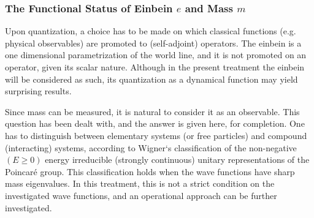 \documentclass[twoside,a4paper,11pt]{article}
\numberwithin{equation}{section}
\begin{document}

 
\subsubsection{The Functional Status of Einbein $e$ and Mass $m$}

Upon quantization, a choice has to be made on which classical functions (e.g. physical observables) are promoted to (self-adjoint) operators. The einbein is a one dimensional parametrization of the world line, and it is not promoted on an operator, given its scalar nature. Although in the present treatment the einbein will be considered as such, its quantization as a dynamical function may yield surprising results.

Since mass can be measured, it is natural to consider it as an observable. This question has been dealt with, and the answer is given here, for completion. One has to distinguish between elementary systems (or free particles) and compound (interacting) systems, according to Wigner`s classification \cite{WignerClassification} of the non-negative $(E \geq 0)$ energy irreducible (strongly continuous) unitary representations of the Poincaré group. This classification holds when the wave functions have sharp mass eigenvalues. In this treatment, this is not a strict condition on the investigated wave functions, and an operational approach can be further investigated.
\end{document}
